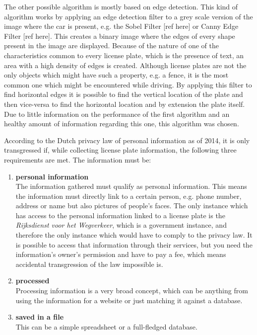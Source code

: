The other possible algorithm is mostly based on edge detection. This kind of algorithm works by applying an edge detection filter to a grey scale version of the image where the car is present, e.g. the Sobel Filter [ref here] or Canny Edge Filter [ref here]. This creates a binary image where the edges of every shape present in the image are displayed. Because of the nature of one of the characteristics common to every license plate, which is the presence of text, an area with a high density of edges is created. Although license plates are not the only objects which might have such a property, e.g. a fence, it is the most common one which might be encountered while driving. By applying this filter to find horizontal edges it is possible to find the vertical location of the plate and then vice-versa to find the horizontal location and by extension the plate itself. Due to little information on the performance of the first algorithm and an healthy amount of information regarding this one, this algorithm was chosen.


According to the Dutch privacy law of personal information as of 2014, it is only transgressed if, while collecting license plate information, the following three requirements are met. The information must be:

\begin{enumerate}
    \item{\textbf{personal information} \\
        The information gathered must qualify as personal information. This means the information must directly link to a certain person, e.g. phone number, address or name but also pictures of people's faces. The only instance which has access to the personal information linked to a license plate is the \textit{Rijksdienst voor het Wegverkeer}, which is a government instance, and therefore the only instance which would have to comply to the privacy law. It is possible to access that information through their services, but you need the information's owner's permission and have to pay a fee, which means accidental transgression of the law impossible is.
    }

    \item{\textbf{processed} \\
        Processing information is a very broad concept, which can be anything from using the information for a website or just matching it against a database.
    }

    \item{\textbf{saved in a file} \\
        This can be a simple spreadsheet or a full-fledged database.
    }
\end{enumerate}

